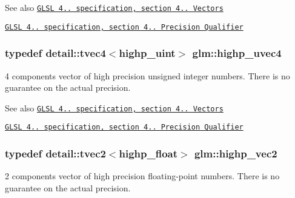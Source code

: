 \begin{DoxySeeAlso}{\-See also}
\href{http://www.opengl.org/registry/doc/GLSLangSpec.4.20.8.pdf}{\tt \-G\-L\-S\-L 4.. specification, section 4.. \-Vectors} 

\href{http://www.opengl.org/registry/doc/GLSLangSpec.4.20.8.pdf}{\tt \-G\-L\-S\-L 4.. specification, section 4.. \-Precision \-Qualifier} 
\end{DoxySeeAlso}
\hypertarget{group__core__precision_gadc25684638be5d1caeb63d3d5e55feec}{
\subsubsection[{highp\-\_\-uvec4}]{\setlength{\rightskip}{0pt plus 5cm}typedef detail\-::tvec4$<$highp\-\_\-uint$>$ {\bf glm\-::highp\-\_\-uvec4}}}\label{group__core__precision_gadc25684638be5d1caeb63d3d5e55feec}
4 components vector of high precision unsigned integer numbers. \-There is no guarantee on the actual precision.

\begin{DoxySeeAlso}{\-See also}
\href{http://www.opengl.org/registry/doc/GLSLangSpec.4.20.8.pdf}{\tt \-G\-L\-S\-L 4.. specification, section 4.. \-Vectors} 

\href{http://www.opengl.org/registry/doc/GLSLangSpec.4.20.8.pdf}{\tt \-G\-L\-S\-L 4.. specification, section 4.. \-Precision \-Qualifier} 
\end{DoxySeeAlso}
\hypertarget{group__core__precision_ga0747567a49e0fa00ecd05011c1645d69}{
\subsubsection[{highp\-\_\-vec2}]{\setlength{\rightskip}{0pt plus 5cm}typedef detail\-::tvec2$<$highp\-\_\-float$>$ {\bf glm\-::highp\-\_\-vec2}}}\label{group__core__precision_ga0747567a49e0fa00ecd05011c1645d69}
2 components vector of high precision floating-\/point numbers. \-There is no guarantee on the actual precision.

